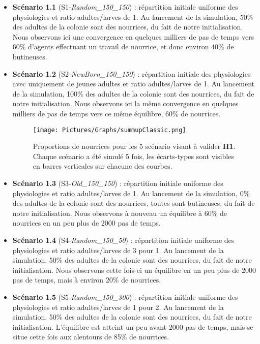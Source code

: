 	\begin{itemize}	
		\item \textbf{Scénario 1.1} (S1-\textit{Random\_150\_150}) : répartition initiale uniforme des physiologies et ratio adultes/larves de 1. Au lancement de la simulation, 50\% des adultes de la colonie sont des nourrices, du fait de notre initialisation. Nous observons ici une convergence en quelques milliers de pas de temps vers 60\% d'agents effectuant un travail de nourrice, et donc environ 40\% de butineuses.
		
		\item \textbf{Scénario 1.2} (S2-\textit{NewBorn\_150\_150}) : répartition initiale des physiologies avec uniquement de jeunes adultes et ratio adultes/larves de 1. Au lancement de la simulation, 100\% des adultes de la colonie sont des nourrices, du fait de notre initialisation. Nous observons ici la même convergence en quelques milliers de pas de temps vers ce même équilibre, 60\% de nourrices.
	
	\begin{figure}
	\centering
	\texttt{[image: Pictures/Graphs/summupClassic.png]}
	\caption[Proportions de nourrices pour les 5 scénario visant à valider \textbf{H1}.]{Proportions de nourrices pour les 5 scénario visant à valider \textbf{H1}. Chaque scénario a été simulé 5 fois, les écarts-types sont visibles en barres verticales sur chacune des courbes.}
	\label{envConstant}
	\end{figure}
		
		\item \textbf{Scénario 1.3} (S3-\textit{Old\_150\_150}) : répartition initiale uniforme des physiologies et ratio adultes/larves de 1. Au lancement de la simulation, 0\% des adultes de la colonie sont des nourrices, toutes sont butineuses, du fait de notre initialisation. Nous observons à nouveau un équilibre à 60\% de nourrices en un peu plus de 2000 pas de temps.
		
		\item \textbf{Scénario 1.4} (S4-\textit{Random\_150\_50}) : répartition initiale uniforme des physiologies et ratio adultes/larves de 3 pour 1. Au lancement de la simulation, 50\% des adultes de la colonie sont des nourrices, du fait de notre initialisation. Nous observons cette fois-ci un équilibre en un peu plus de 2000 pas de temps, mais à environ 20\% de nourrices.
		
		\item \textbf{Scénario 1.5} (S5-\textit{Random\_150\_300}) : répartition initiale uniforme des physiologies et ratio adultes/larves de 1 pour 2. Au lancement de la simulation, 50\% des adultes de la colonie sont des nourrices, du fait de notre initialisation. L'équilibre est atteint un peu avant 2000 pas de temps, mais se situe cette fois aux alentours de 85\% de nourrices.		
	\end{itemize}
	
